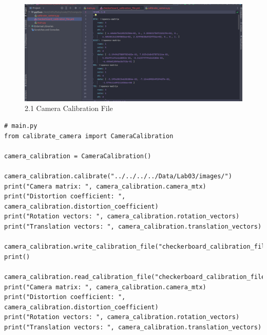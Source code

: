 \documentclass[a4paper, 12pt]{article}
\begin{document}
	\begin{figure}
		\caption{2.1 Camera Calibration File}
		\includegraphics[scale=0.25]{images/camera_calibration_file.png}
	\end{figure}

	\begin{lstlisting}
# main.py
from calibrate_camera import CameraCalibration

camera_calibration = CameraCalibration()

camera_calibration.calibrate("../../../../Data/Lab03/images/")
print("Camera matrix: ", camera_calibration.camera_mtx)
print("Distortion coefficient: ", camera_calibration.distortion_coefficient)
print("Rotation vectors: ", camera_calibration.rotation_vectors)
print("Translation vectors: ", camera_calibration.translation_vectors)

camera_calibration.write_calibration_file("checkerboard_calibration_file.yml")
print()

camera_calibration.read_calibration_file("checkerboard_calibration_file.yml")
print("Camera matrix: ", camera_calibration.camera_mtx)
print("Distortion coefficient: ", camera_calibration.distortion_coefficient)
print("Rotation vectors: ", camera_calibration.rotation_vectors)
print("Translation vectors: ", camera_calibration.translation_vectors)
	\end{lstlisting}
\end{document}
